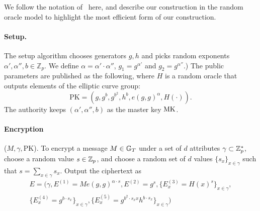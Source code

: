 \documentclass[a4paper, 11pt]{article}
\newcommand{\Z}{\ensuremath{\mathbb{Z}}}
\newcommand{\G}{\ensuremath{\mathbb{G}}}
\theoremstyle{definition}
\newcommand{\Zp}{\ensuremath{{\Z_p}}}
\newcommand{\PK}{\ensuremath{\textrm{PK}}}
\begin{document}
We follow the notation of~\cite{OSW07} here, and describe our construction in the random oracle model to highlight the most efficient form of our construction.

\paragraph{Setup.}
The setup algorithm chooses generators $g,h$ and picks random exponents
$\alpha', \alpha'', b \in \Zp$. We define $\alpha = \alpha' \cdot \alpha''$, $g_1 = g^{\alpha'}$ and $g_2 = g^{\alpha''}$.) The public parameters are published as the following, where $H$ is a random oracle that outputs elements of the elliptic curve group:
\[
\PK=( g,
g^{b},
g^{b^{2}},
h^{b},
e(g,g)^{\alpha}, H(\cdot) ).
\]
The authority keeps $(\alpha', \alpha'', b)$ as the master key $\textrm{MK}$.


%

\paragraph{Encryption} ($M,\gamma,\PK$).
To encrypt a
message $M \in \mathbb{G}_T$ under a set of $d$ attributes $\gamma \subset \mathbb{Z}_p^*$,
choose a random value $s\in\mathbb{Z}_p$, and choose a random set of $d$ values $\{s_x\}_{x \in \gamma}$
such that $s= \sum_{x \in \gamma} s_x$. Output the ciphertext
as
\begin{eqnarray*}
E = (
\gamma, E^{(1)} = M e(g, g)^{\alpha \cdot s},
E^{(2)} = g^s,
\{E^{(3)}_x = H(x)^s\}_{x\in\gamma}, \\
\{E^{(4)}_x = g^{b\cdot s_x}\}_{x\in\gamma},
\{E^{(5)}_x = g^{b^2\cdot s_x x} h^{b \cdot s_x}\}_{x\in\gamma}
)
\end{eqnarray*}
\end{document}
